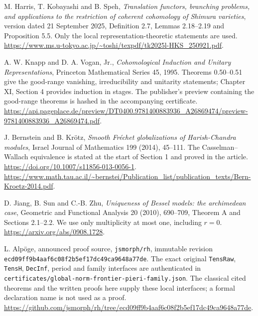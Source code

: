 M. Harris, T. Kobayashi and B. Speh,
\emph{Translation functors, branching problems, and applications to the
restriction of coherent cohomology of Shimura varieties},
version dated 21 September 2025,
Definition 2.7, Lemmas 2.18--2.19 and Proposition 5.5.
Only the local representation-theoretic statements are used.
\url{https://www.ms.u-tokyo.ac.jp/~toshi/texpdf/tk2025l-HKS_250921.pdf}.

A. W. Knapp and D. A. Vogan, Jr.,
\emph{Cohomological Induction and Unitary Representations},
Princeton Mathematical Series 45, 1995.
Theorems 0.50--0.51 give the good-range vanishing,
irreducibility and unitarity statements; Chapter XI, Section 4
provides induction in stages.
The publisher's preview containing the good-range theorems is
hashed in the accompanying certificate.
\url{https://api.pageplace.de/preview/DT0400.9781400883936_A26869474/preview-9781400883936_A26869474.pdf}.

J. Bernstein and B. Kr\"otz,
\emph{Smooth Fr\'echet globalizations of Harish-Chandra modules},
Israel Journal of Mathematics 199 (2014), 45--111.
The Casselman--Wallach equivalence is stated at the start of
Section 1 and proved in the article.
\url{https://doi.org/10.1007/s11856-013-0056-1}.
\url{https://www.math.tau.ac.il/~bernstei/Publication_list/publication_texts/Bern-Kroetz-2014.pdf}.

D. Jiang, B. Sun and C.-B. Zhu,
\emph{Uniqueness of Bessel models: the archimedean case},
Geometric and Functional Analysis 20 (2010), 690--709,
Theorem A and Sections 2.1--2.2.
We use only multiplicity at most one, including $r=0$.
\url{https://arxiv.org/abs/0908.1728}.

L. Alp\"oge, announced proof source, \texttt{jsmorph/rh},
immutable revision
\texttt{ecd09ff9b4aaf6c08f2b5ef17dc49ca9648a77de}.
The exact original \texttt{TensRaw}, \texttt{TensH},
\texttt{DecInf}, period and family interfaces are authenticated in
\texttt{certificates/global-norm-frontier-pieri-family.json}.
The classical cited theorems and the written proofs here supply
these local interfaces; a formal declaration name is not used as
a proof.
\url{https://github.com/jsmorph/rh/tree/ecd09ff9b4aaf6c08f2b5ef17dc49ca9648a77de}.
